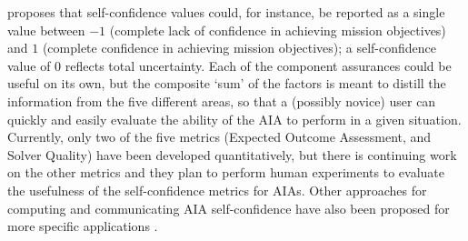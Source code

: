 \citet{Aitken2016-cv} proposes that self-confidence values could, for instance, be reported as a single value between $-1$ (complete lack of confidence in achieving mission objectives) and $1$ (complete confidence in achieving mission objectives); a self-confidence value of $0$ reflects total uncertainty. Each of the component assurances could be useful on its own, but the composite `sum' of the factors is meant to distill the information from the five different areas, so that a (possibly novice) user can quickly and easily evaluate the ability of the AIA to perform in a given situation. Currently, only two of the five metrics (Expected Outcome Assessment, and Solver Quality) have been developed quantitatively, but there is continuing work on the other metrics and they plan to perform human experiments to evaluate the usefulness of the self-confidence metrics for AIAs. Other approaches for computing and communicating AIA self-confidence have also been proposed for more specific applications \cite{Hutchins2015-if, Kaipa2015-hy, Zagorecki2015-qy, Kuter2015-qh}. 
